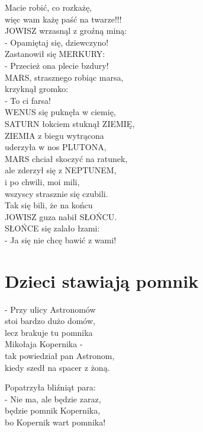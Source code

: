 \documentclass[11pt,a4pape,leqno,twoside]{book}
\begin{document}
Macie robić, co rozkażę,\\
więc wam każę paść na twarze!!!\\
JOWISZ wrzasnąl z groźną miną:\\
- Opamiętaj się, dziewczyno!\\
Zastanowił się MERKURY:\\
- Przecież ona plecie bzdury!\\
MARS, strasznego robiąc marsa,\\
krzyknął gromko:\\
- To ci farsa!\\
WENUS się puknęła w ciemię,\\
SATURN łokciem stuknął ZIEMIĘ,\\
ZIEMIA z biegu wytrącona\\
uderzyła w nos PLUTONA,\\
MARS chciał skoczyć na ratunek,\\
ale zderzył się z NEPTUNEM,\\
i po chwili, moi mili,\\
wszyscy strasznie się czubili.\\
Tak się bili, że na końcu\\
JOWISZ guza nabił SŁOŃCU.\\
SŁOŃCE się zalało łzami:\\
- Ja się nie chcę bawić z wami!

\chapter{Dzieci stawiają pomnik}
- Przy ulicy Astronomów\\
stoi bardzo dużo domów,\\
lecz brakuje tu pomnika\\
Mikołaja Kopernika -\\
tak powiedział pan Astronom,\\
kiedy szedł na spacer z żoną.\\ \vspace{0.1cm}

Popatrzyła bliźniąt para:\\
- Nie ma, ale będzie zaraz,\\
będzie pomnik Kopernika,\\
bo Kopernik wart pomnika!\\ \vspace{0.1cm}
\end{document}
